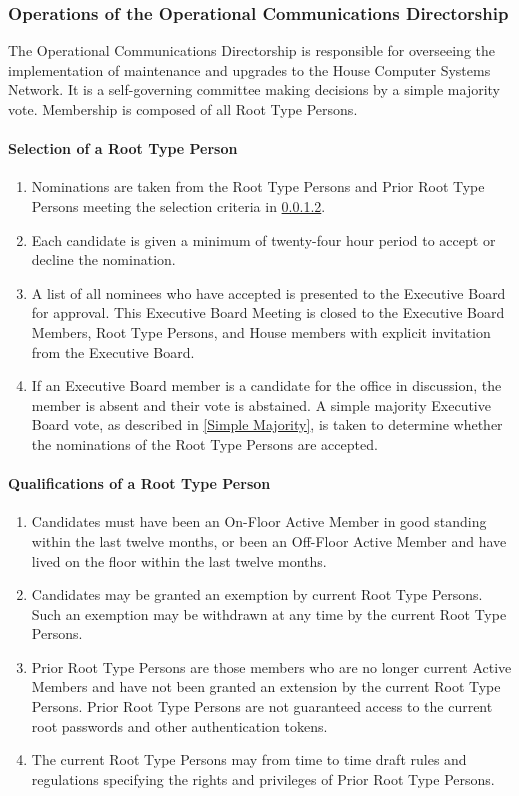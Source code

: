 \documentclass{article}
\newcommand{\asubsection}[1]{\subsubsection{#1} \label{#1}}
\newcommand{\asubsubsection}[1]{\paragraph{#1} \label{#1}}
\begin{document}
\asubsection{Operations of the Operational Communications Directorship}
The Operational Communications Directorship is responsible for overseeing the implementation of maintenance and upgrades to the House Computer Systems Network.
It is a self-governing committee making decisions by a simple majority vote.
Membership is composed of all Root Type Persons.

\asubsubsection{Selection of a Root Type Person}
\renewcommand{\theenumi}{\alph{enumi}} %
\begin{enumerate}
	\item Nominations are taken from the Root Type Persons and Prior Root Type Persons meeting the selection criteria in \ref{Qualifications of a Root Type Person}.
	\item Each candidate is given a minimum of twenty-four hour period to accept or decline the nomination.
	\item A list of all nominees who have accepted is presented to the Executive Board for approval.
		This Executive Board Meeting is closed to the Executive Board Members, Root Type Persons, and House members with explicit invitation from the Executive Board.
	\item If an Executive Board member is a candidate for the office in discussion, the member is absent and their vote is abstained.
		A simple majority Executive Board vote, as described in \ref{Simple Majority}, is taken to determine whether the nominations of the Root Type Persons are accepted.
\end{enumerate}

\asubsubsection{Qualifications of a Root Type Person}
\renewcommand{\theenumi}{\alph{enumi}} %
\begin{enumerate}
	\item Candidates must have been an On-Floor Active Member in good standing within the last twelve months, or been an Off-Floor Active Member and have lived on the floor within the last twelve months.
	\item Candidates may be granted an exemption by current Root Type Persons.
		Such an exemption may be withdrawn at any time by the current Root Type Persons.
	\item Prior Root Type Persons are those members who are no longer current Active Members and have not been granted an extension by the current Root Type Persons.
		Prior Root Type Persons are not guaranteed access to the current root passwords and other authentication tokens.
	\item The current Root Type Persons may from time to time draft rules and regulations specifying the rights and privileges of Prior Root Type Persons.
\end{enumerate}
\end{document}
